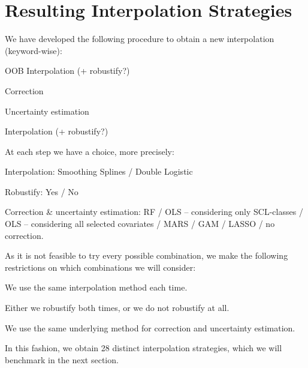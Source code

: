 \section{Resulting Interpolation Strategies}{
    \label{sec:corr_itpl_stat}
    We have developed the following procedure to obtain a new interpolation (keyword-wise):
    \begin{Nenumerate}
        \item OOB Interpolation (+ robustify?)
        \item Correction 
        \item Uncertainty estimation
        \item Interpolation (+ robustify?)
    \end{Nenumerate}
    At each step we have a choice, more precisely:
    \begin{Nitemize}
        \item Interpolation: Smoothing Splines / Double Logistic
        \item Robustify: Yes / No
        \item Correction \& uncertainty estimation: RF / OLS -- considering only SCL-classes / OLS -- considering all selected covariates / MARS / GAM / LASSO / no correction.
    \end{Nitemize}
    As it is not feasible to try every possible combination, we make the following restrictions on which combinations we will consider:
    \begin{Nitemize}
        \item We use the same interpolation method each time.
        \item Either we robustify both times, or we do not robustify at all.
        \item We use the same underlying method for correction and uncertainty estimation.
    \end{Nitemize}

    In this fashion, we obtain 28 distinct interpolation strategies, which we will benchmark in the next section.
}

